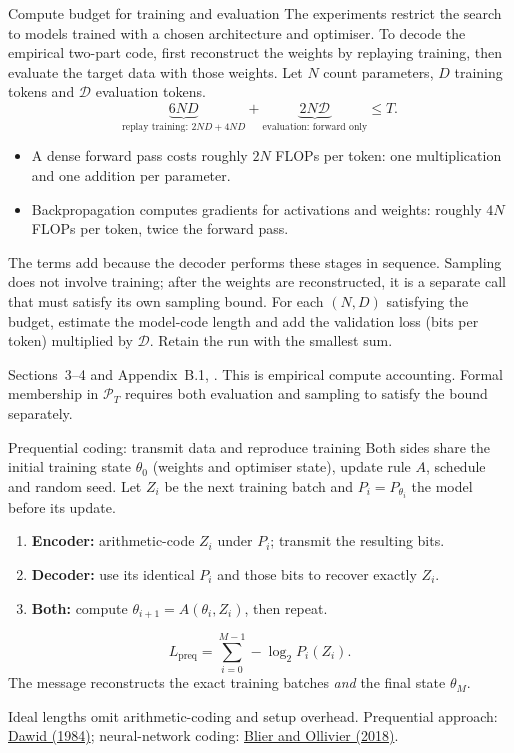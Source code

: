 \documentclass[aspectratio=169,notheorems]{beamer}
\theoremstyle{definition}
\newcommand{\Dt}{\mathcal{D}}
\newcommand{\PT}{\mathcal{P}_T}
\newcommand{\src}[1]{{\scriptsize\color{black!60}#1\par}}
\begin{document}
\begin{frame}{Compute budget for training and evaluation}
\small
The experiments restrict the search to models trained with a chosen architecture and optimiser. To decode the empirical two-part code, first reconstruct the weights by replaying training, then evaluate the target data with those weights. Let $N$ count parameters, $D$ training tokens and $\Dt$ evaluation tokens.
\[
\underbrace{6ND}_{\text{replay training: }2ND+4ND}
+\underbrace{2N\Dt}_{\text{evaluation: forward only}}\le T.
\]
\begin{itemize}\setlength{\itemsep}{0.6em}
\item A dense forward pass costs roughly $2N$ FLOPs per token: one multiplication and one addition per parameter.
\item Backpropagation computes gradients for activations and weights: roughly $4N$ FLOPs per token, twice the forward pass.
\end{itemize}
The terms add because the decoder performs these stages in sequence. Sampling does not involve training; after the weights are reconstructed, it is a separate call that must satisfy its own sampling bound.
For each $(N,D)$ satisfying the budget, estimate the model-code length and add the validation loss (bits per token) multiplied by $\Dt$. Retain the run with the smallest sum.
\par\medskip
\src{Sections~3--4 and Appendix~B.1, \citet{finzi2026}. This is empirical compute accounting. Formal membership in $\PT$ requires both evaluation and sampling to satisfy the bound separately.}
\end{frame}
\begin{frame}{Prequential coding: transmit data and reproduce training}
\small
Both sides share the initial training state $\theta_0$ (weights and optimiser state), update rule $A$, schedule and random seed. Let $Z_i$ be the next training batch and $P_i=P_{\theta_i}$ the model before its update.
\begin{enumerate}\setlength{\itemsep}{0.6em}
\item \textbf{Encoder:} arithmetic-code $Z_i$ under $P_i$; transmit the resulting bits.
\item \textbf{Decoder:} use its identical $P_i$ and those bits to recover exactly $Z_i$.
\item \textbf{Both:} compute $\theta_{i+1}=A(\theta_i,Z_i)$, then repeat.
\end{enumerate}
\[
L_{\mathrm{preq}}=\sum_{i=0}^{M-1}-\log_2 P_i(Z_i).
\]
The message reconstructs the exact training batches \emph{and} the final state $\theta_M$.
\par\medskip
\src{Ideal lengths omit arithmetic-coding and setup overhead. Prequential approach: \href{https://doi.org/10.2307/2981683}{Dawid (1984)}; neural-network coding: \href{https://arxiv.org/abs/1802.07044}{Blier and Ollivier (2018)}.}
\end{frame}
\end{document}
